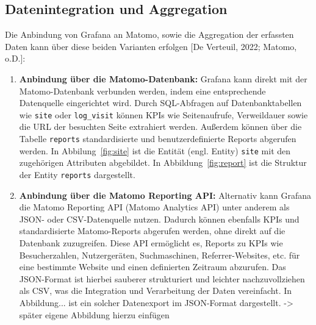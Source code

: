 \subsection{Datenintegration und Aggregation}
Die Anbindung von Grafana an Matomo, sowie die Aggregation der erfassten Daten kann über diese beiden Varianten erfolgen [De Verteuil, 2022; Matomo, o.D.]:

\begin{enumerate}
    \item \textbf{Anbindung über die Matomo-Datenbank:}  
    Grafana kann direkt mit der Matomo-Datenbank verbunden werden, indem eine entsprechende Datenquelle eingerichtet wird. Durch SQL-Abfragen auf Datenbanktabellen wie \verb|site| oder \verb|log_visit| können KPIs wie Seitenaufrufe, Verweildauer sowie die URL der besuchten Seite extrahiert werden. Außerdem können über die Tabelle \verb|reports| standardisierte und benutzerdefinierte Reports abgerufen werden. In Abbilung~\ref{fig:site} ist die Entität (engl. Entity) \verb|site| mit den zugehörigen Attributen abgebildet. In Abbildung~\ref{fig:report} ist die Struktur der Entity \verb|reports| dargestellt. 
    \item \textbf{Anbindung über die Matomo Reporting API:}  
    Alternativ kann Grafana die Matomo Reporting API (Matomo Analytics API) unter anderem als JSON- oder CSV-Datenquelle nutzen. Dadurch können ebenfalls KPIs und standardisierte Matomo-Reports abgerufen werden, ohne direkt auf die Datenbank zuzugreifen. Diese API ermöglicht es, Reports zu KPIs wie Besucherzahlen, Nutzergeräten, Suchmaschinen, Referrer-Websites, etc. für eine bestimmte Website und einen definierten Zeitraum abzurufen. Das JSON-Format ist hierbei sauberer strukturiert und leichter nachzuvollziehen als CSV, was die Integration und Verarbeitung der Daten vereinfacht. In Abbildung... ist ein solcher Datenexport im JSON-Format dargestellt. -> später eigene Abbildung hierzu einfügen
\end{enumerate}

